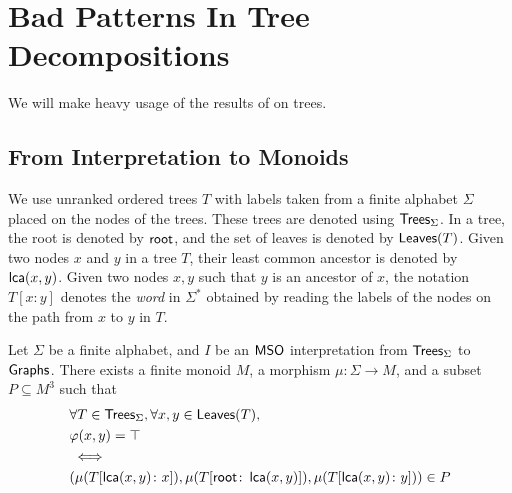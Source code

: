 \section{Bad Patterns In Tree Decompositions}
\label{sec:bad-patterns}

We will make heavy usage of the results of \cite{COLC07} on trees.

\subsection{From Interpretation to Monoids}

\AP We use unranked ordered trees $T$ with labels taken from a finite alphabet
$\Sigma$ placed on the nodes of the trees. These trees are denoted using
$\mathsf{Trees}_{\Sigma}$. In a tree, the root is denoted by $\mathsf{root}$, and the set of
leaves is denoted by $\mathsf{Leaves}(T)$. Given two nodes $x$ and $y$ in a tree $T$,
their least common ancestor is denoted by $\mathop{\mathsf{lca}}(x,y)$. Given two nodes $x,y$
such that $y$ is an ancestor of $x$, the notation $T[x:y]$ denotes the
\emph{word} in $\Sigma^*$ obtained by reading the labels of the nodes on the
path from $x$ to $y$ in $T$. 


\begin{lemma}
    \label{interpretation-to-monoid:lem}
    Let $\Sigma$ be a finite alphabet, and $I$ be an $\mathsf{MSO}$ interpretation
    from $\mathsf{Trees}_{\Sigma}$ to $\Graphs$.
    There exists a finite monoid $M$, a morphism
    $\mu \colon \Sigma \to M$,
    and a subset $P \subseteq M^3$ such that
    \begin{align*}
        &\forall T \in \mathsf{Trees}_{\Sigma},
        \forall x,y \in \mathsf{Leaves}(T), \\
        &\varphi(x,y) = \top \\
        &\iff \\
        &(\mu(T[\mathop{\mathsf{lca}}(x,y) \colon x]), 
          \mu(T[\mathsf{root} \colon \mathop{\mathsf{lca}}(x,y)]), 
          \mu(T[\mathop{\mathsf{lca}}(x,y) \colon y])) \in P
    \end{align*}
\end{lemma}

